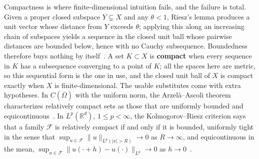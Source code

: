 Compactness is where finite-dimensional intuition fails, and the failure is total. Given a proper closed subspace $Y \subsetneq X$ and any $\theta < 1$, Riesz's lemma produces a unit vector whose distance from $Y$ exceeds $\theta$; applying this along an increasing chain of subspaces yields a sequence in the closed unit ball whose pairwise distances are bounded below, hence with no Cauchy subsequence. Boundedness therefore buys nothing by itself~\cite{brezis2011functional}. A set $K \subset X$ is \textbf{compact} when every sequence in $K$ has a subsequence converging to a point of $K$; all the spaces here are metric, so this sequential form is the one in use, and the closed unit ball of $X$ is compact exactly when $X$ is finite-dimensional. The usable substitutes come with extra hypotheses. In $C(\overline{\Omega})$ with the uniform norm, the Arzel\`a--Ascoli theorem characterizes relatively compact sets as those that are uniformly bounded and equicontinuous~\cite{brezis2011functional}. In $L^p(\mathbb{R}^d)$, $1 \le p < \infty$, the Kolmogorov--Riesz criterion says that a family $\mathcal{F}$ is relatively compact if and only if it is bounded, uniformly tight in the sense that
$\sup_{u \in \mathcal{F}} \|u\|_{L^p(|x| > R)} \to 0$ as $R \to \infty$, and equicontinuous in the mean,
$\sup_{u \in \mathcal{F}} \|u(\cdot + h) - u(\cdot)\|_{L^p} \to 0$ as $h \to 0$~\cite{brezis2011functional}.

